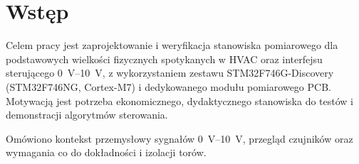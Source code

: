 \section{Wstęp}
Celem pracy jest zaprojektowanie i weryfikacja stanowiska pomiarowego dla podstawowych wielkości fizycznych spotykanych w HVAC oraz interfejsu sterującego \SI{0}{\volt}–\SI{10}{\volt}, z wykorzystaniem zestawu STM32F746G-Discovery (STM32F746NG, Cortex-M7) i dedykowanego modułu pomiarowego PCB. Motywacją jest potrzeba ekonomicznego, dydaktycznego stanowiska do testów i demonstracji algorytmów sterowania.

Omówiono kontekst przemysłowy sygnałów \SI{0}{\volt}–\SI{10}{\volt}, przegląd czujników oraz wymagania co do dokładności i izolacji torów.